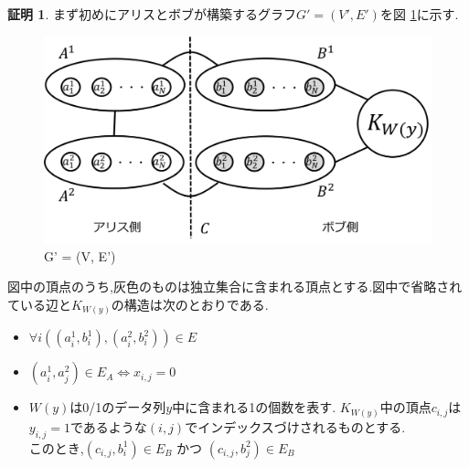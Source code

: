 \documentclass[12pt]{thesis}
\theoremstyle{definition}
\newtheorem*{prf*}{証明}
\begin{document}
\begin{prf*}
まず初めにアリスとボブが構築するグラフ$G' = (V', E')$を図 \ref{2MIS}に示す. 

\begin{figure}[ht]
\begin{center}
\includegraphics[width=120mm]{2MIS.png}
\end{center}
\caption{G' = (V, E')}
\label{2MIS}
\end{figure}

図中の頂点のうち,灰色のものは独立集合に含まれる頂点とする.図中で省略されている辺と$K_{W(y)}$の構造は次のとおりである.
\begin{itemize}
\item $\forall i((a_{i}^{1}, b_{i}^{1}), (a_{i}^{2}, b_{i}^{2})) \in E$
\item $(a_{i}^{1}, a_{j}^{2}) \in E_{A} \Leftrightarrow x_{i, j} = 0$
\item $W(y)$は0/1のデータ列$y$中に含まれる1の個数を表す.
$K_{W(y)}$中の頂点$c_{i, j}$は$y_{i, j} = 1$であるような$(i, j)$でインデックスづけされるものとする. \\
このとき,$(c_{i, j}, b_{i}^{1}) \in E_{B}$ かつ $(c_{i, j}, b_{j}^{2}) \in E_{B}$
\end{itemize}


\end{prf*}
\end{document}

